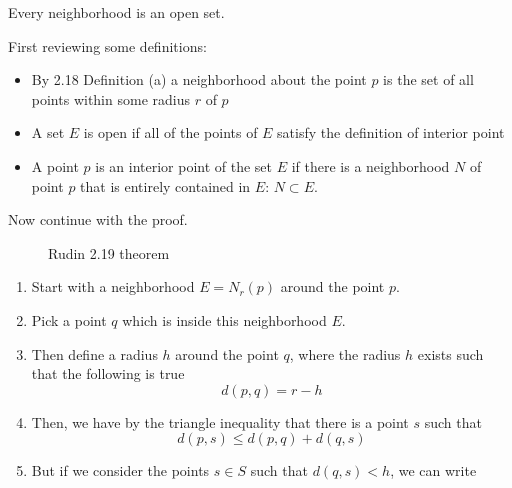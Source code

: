 \begin{thm-dan}[2.19]
  Every neighborhood is an open set.
\end{thm-dan}

\begin{proof-dan}
  First reviewing some definitions:
  \begin{itemize}
    \item{By 2.18 Definition (a) a neighborhood about the point $p$ is the set of all points within some radius $r$ of $p$}
    \item{A set $E$ is open if all of the points of $E$ satisfy the definition of interior point}
    \item{A point $p$ is an interior point of the set $E$ if there is a neighborhood $N$ of point $p$ that is entirely contained in $E$: $N\subset E$.}
  \end{itemize}
  Now continue with the proof.
  \begin{figure}[H]
    \begin{center}
      \caption{Rudin 2.19 theorem}
    \end{center}
  \end{figure}
  \begin{enumerate}
    \item{Start with a neighborhood $E=N_{r}(p)$ around the point $p$.}
    \item{Pick a point $q$ which is inside this neighborhood $E$.}
    \item{Then define a radius $h$ around the point $q$, where the radius $h$ exists such that the following is true}
  \begin{equation*}
    d(p,q)=r-h
  \end{equation*}
  \item{Then, we have by the triangle inequality that there is a point $s$ such that}
  \begin{equation*}
    d(p,s)\leq d(p,q)+d(q,s)
  \end{equation*}
  \item{But if we consider the points $s\in S$ such that $d(q,s)<h$, we can write}

\end{enumerate}
\end{proof-dan}
